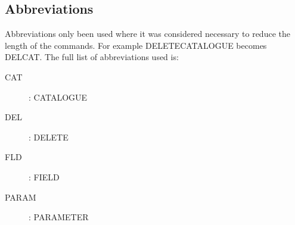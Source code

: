 \subsection{Abbreviations}

Abbreviations  only been used where it was considered necessary to reduce
the length of the commands. For example  {\small DELETECATALOGUE} becomes
{\small DELCAT}. The full list of abbreviations used is:

\begin{description}
\begin{description}
\item [CAT]: CATALOGUE
\item [DEL]: DELETE
\item [FLD]: FIELD
\item [PARAM]: PARAMETER
\end{description}
\end{description}











